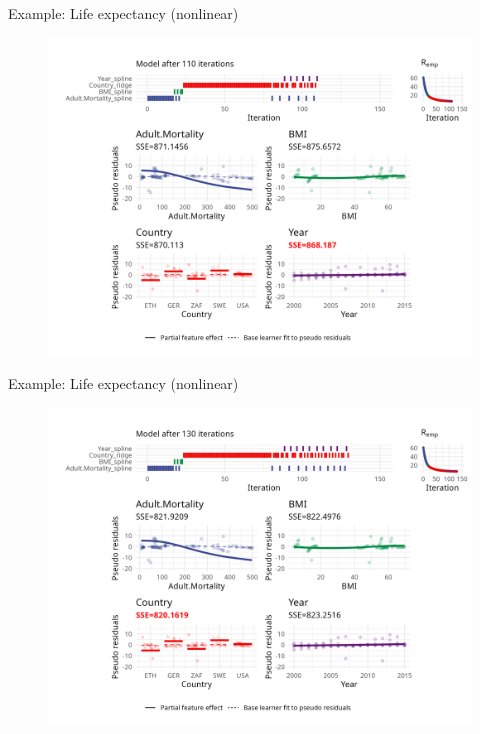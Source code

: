 \begin{frame}{Example: Life expectancy (nonlinear)}
	\begin{figure}
		\centering
		\includegraphics[width=\textwidth]{figure/cwb-anim-nl/fig-iter-0110.png}
	\end{figure}
	\addtocounter{framenumber}{-1}
\end{frame}


\begin{frame}{Example: Life expectancy (nonlinear)}
	\begin{figure}
		\centering
		\includegraphics[width=\textwidth]{figure/cwb-anim-nl/fig-iter-0130.png}
	\end{figure}
	\addtocounter{framenumber}{-1}
\end{frame}


